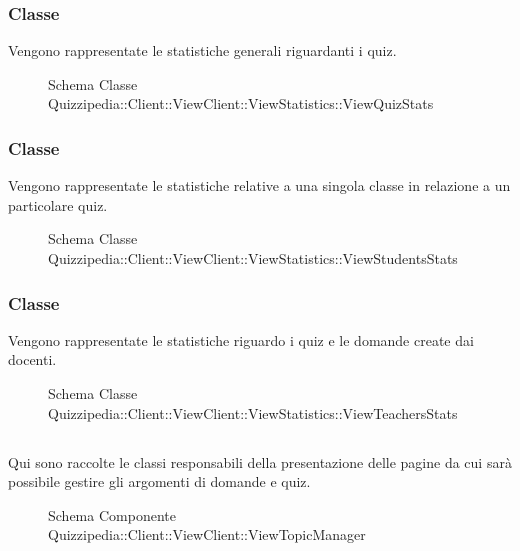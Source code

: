\subsubsection{Classe }
Vengono rappresentate le statistiche generali riguardanti i quiz.
\begin{figure}[H]
\centering
\noindent{}
\caption[Schema Classe ViewQuizStats]{Schema Classe Quizzipedia::Client::ViewClient::ViewStatistics::ViewQuizStats}
\end{figure}
\subsubsection{Classe }
Vengono rappresentate le statistiche relative a una singola classe in relazione a un particolare quiz.
\begin{figure}[H]
\centering
\noindent{}
\caption[Schema Classe ViewStudentsStats]{Schema Classe Quizzipedia::Client::ViewClient::ViewStatistics::ViewStudentsStats}
\end{figure}
\subsubsection{Classe }
Vengono rappresentate le statistiche riguardo i quiz e le domande create dai docenti.
\begin{figure}[H]
\centering
\noindent{}
\caption[Schema Classe ViewTeachersStats]{Schema Classe Quizzipedia::Client::ViewClient::ViewStatistics::ViewTeachersStats}
\end{figure}
\subsection{}
Qui sono raccolte le classi responsabili della presentazione delle pagine da cui sarà possibile gestire gli argomenti di domande e quiz.
\begin{figure}[H]
\centering
\noindent{}
\caption[Schema Componente Quizzipedia::Client::ViewClient::ViewTopicManager]{Schema Componente Quizzipedia::Client::ViewClient::ViewTopicManager}
\end{figure}
